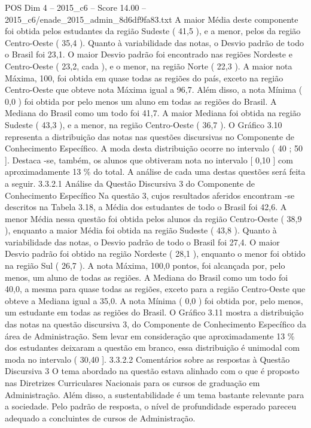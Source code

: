 \begin{textsample}{POS Dim 4 – 2015\_c6 – Score 14.00 – 2015\_c6/enade\_2015\_admin\_8d6df9fa83.txt}
A maior Média deste componente foi obtida pelos estudantes da região Sudeste ( 41,5 ), e a menor, pelos da região Centro-Oeste ( 35,4 ).
Quanto à variabilidade das notas, o Desvio padrão de todo o Brasil foi 23,1.
O maior Desvio padrão foi encontrado nas regiões Nordeste e Centro-Oeste ( 23,2, cada ), e o menor, na região Norte ( 22,3 ).
A maior nota Máxima, 100, foi obtida em quase todas as regiões do país, exceto na região Centro-Oeste que obteve nota Máxima igual a 96,7.
Além disso, a nota Mínima ( 0,0 ) foi obtida por pelo menos um aluno em todas as regiões do Brasil.
A Mediana do Brasil como um todo foi 41,7.
A maior Mediana foi obtida na região Sudeste ( 43,3 ), e a menor, na região Centro-Oeste ( 36,7 ).
O Gráfico 3.10 representa a distribuição das notas nas questões discursivas no Componente de Conhecimento Específico.
A moda desta distribuição ocorre no intervalo ( 40 ; 50 ].
Destaca -se, também, os alunos que obtiveram nota no intervalo [ 0,10 ] com aproximadamente 13 \% do total.
A análise de cada uma destas questões será feita a seguir. 3.3.2.1 Análise da Questão Discursiva 3 do Componente de Conhecimento Específico Na questão 3, cujos resultados aferidos encontram -se descritos na Tabela 3.18, a Média dos estudantes de todo o Brasil foi 42,6.
A menor Média nessa questão foi obtida pelos alunos da região Centro-Oeste ( 38,9 ), enquanto a maior Média foi obtida na região Sudeste ( 43,8 ).
Quanto à variabilidade das notas, o Desvio padrão de todo o Brasil foi 27,4.
O maior Desvio padrão foi obtido na região Nordeste ( 28,1 ), enquanto o menor foi obtido na região Sul ( 26,7 ).
A nota Máxima, 100,0 pontos, foi alcançada por, pelo menos, um aluno de todas as regiões.
A Mediana do Brasil como um todo foi 40,0, a mesma para quase todas as regiões, exceto para a região Centro-Oeste que obteve a Mediana igual a 35,0.
A nota Mínima ( 0,0 ) foi obtida por, pelo menos, um estudante em todas as regiões do Brasil.
O Gráfico 3.11 mostra a distribuição das notas na questão discursiva 3, do Componente de Conhecimento Específico da área de Administração.
Sem levar em consideração que aproximadamente 13 \% dos estudantes deixaram a questão em branco, essa distribuição é unimodal com moda no intervalo ( 30,40 ]. 3.3.2.2 Comentários sobre as respostas à Questão Discursiva 3 O tema abordado na questão estava alinhado com o que é proposto nas Diretrizes Curriculares Nacionais para os cursos de graduação em Administração.
Além disso, a sustentabilidade é um tema bastante relevante para a sociedade.
Pelo padrão de resposta, o nível de profundidade esperado pareceu adequado a concluintes de cursos de Administração.

\end{textsample}
